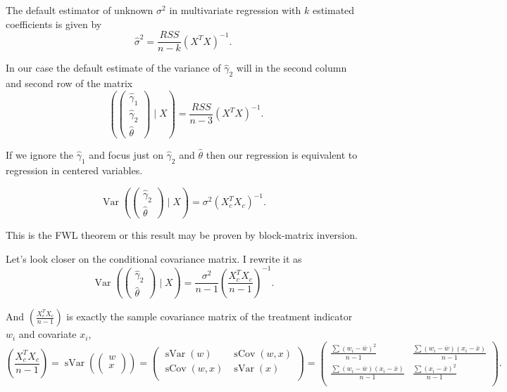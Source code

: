 \documentclass[10pt, a4paper]{article}
\DeclareMathOperator{\Var}{Var}
\DeclareMathOperator{\sVar}{sVar}
\DeclareMathOperator{\hVar}{\widehat{\Var}}
\DeclareMathOperator{\sCov}{sCov}
\begin{document}
The default estimator of unknown $\sigma^2$ in multivariate regression with $k$ 
estimated coefficients is given by 
\[
\hat\sigma^2 = \frac{RSS}{n - k} (X^TX)^{-1}.
\]

In our case the default estimate of the variance of $\hat\gamma_2$ 
will in the second column and second row of the matrix
\[
        \hVar\left( 
        \begin{pmatrix}    
            \hat \gamma_1 \\
            \hat \gamma_2 \\
            \hat \theta
        \end{pmatrix}
        \mid X \right) = \frac{RSS}{n - 3} (X^TX)^{-1}.
\]



If we ignore the $\hat\gamma_1$ and focus just on $\hat\gamma_2$ and $\hat\theta$ then 
our regression is equivalent to regression in centered variables.

\[
\Var\left( 
    \begin{pmatrix}    
        \hat \gamma_2 \\
        \hat \theta
    \end{pmatrix}
    \mid X \right) = \sigma^2 (X_c^TX_c)^{-1}.
\]

This is the FWL theorem or this result may be proven by block-matrix inversion. 


Let's look closer on the conditional covariance matrix.
I rewrite it as 
\[
    \Var\left( 
        \begin{pmatrix}    
            \hat \gamma_2 \\
            \hat \theta
        \end{pmatrix}
        \mid X \right) = \frac{\sigma^2}{n-1} \left(\frac{X_c^TX_c}{n-1}\right)^{-1}.        
\]

And $\left(\frac{X_c^TX_c}{n-1}\right)$ is exactly the sample covariance matrix of the treatment 
indicator $w_i$ and covariate $x_i$, 
\[
    \left(\frac{X_c^TX_c}{n-1}\right) = \sVar\left(
        \begin{pmatrix}    
            w \\
            x \\
        \end{pmatrix}
    \right) =  
    \begin{pmatrix}    
        \sVar(w) & \sCov(w, x) \\
        \sCov(w, x) & \sVar(x) \\
    \end{pmatrix}
    =
    \begin{pmatrix}    
        \frac{\sum (w_i - \bar w)^2}{n-1} & \frac{\sum (w_i - \bar w)(x_i - \bar x)}{n-1} \\
        \frac{\sum (w_i - \bar w)(x_i - \bar x)}{n-1} & \frac{\sum (x_i - \bar x)^2}{n-1} \\
    \end{pmatrix}.    
\]
\end{document}
